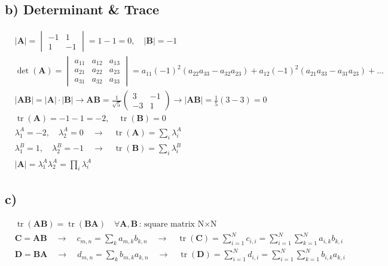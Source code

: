 \documentclass[fleqn]{article}
\DeclareMathOperator{\tr}{tr}
\begin{document}
\subsection*{b) Determinant \& Trace}
\begin{align*}
	&\left|\mathbf{A}\right| =
	\begin{vmatrix}
	-1 & 1 \\
	1 & -1
	\end{vmatrix} = 1-1 = 0,\quad
	\left|\mathbf{B}\right| = -1& \\
	&\det\left(\mathbf{A}\right)=
	\begin{vmatrix}
	a_{11} & a_{12} & a_{13} \\
	a_{21} & a_{22} & a_{23} \\
	a_{31} & a_{32} & a_{33}
	\end{vmatrix}= a_{11}\left(-1\right)^{2}\left(a_{22}a_{33}-a_{32}a_{23}\right)+a_{12}\left(-1\right)^{2}\left(a_{21}a_{33}-a_{31}a_{23}\right)+\ldots& \\
	&\left|\mathbf{AB}\right|=\left|\mathbf{A}\right|\cdot\left|\mathbf{B}\right|\rightarrow\mathbf{AB}=\frac{1}{\sqrt{5}}
	\begin{pmatrix}
	3 & -1 \\
	-3 & 1
	\end{pmatrix}
	\rightarrow\left|\mathbf{AB}\right|=\frac{1}{5}\left(3-3\right)=0& \\
	&\tr\left(\mathbf{A}\right)=-1-1=-2,\quad\tr\left(\mathbf{B}\right)=0& \\
	&\lambda_{1}^{A}=-2,\quad\lambda_{2}^{A}=0\quad\rightarrow\quad\tr\left(\mathbf{A}\right)=\sum_{i}\lambda_{i}^{A}& \\
	&\lambda_{1}^{B}=1,\quad\lambda_{2}^{B}=-1\quad\rightarrow\quad\tr\left(\mathbf{B}\right)=\sum_{i}\lambda_{i}^{B}& \\
	&\left|\mathbf{A}\right|=\lambda_{1}^{A}\lambda_{2}^{A}=\prod_{i}\lambda_{i}^{A}&
\end{align*}

\subsection*{c)}
\begin{align*}
	&\tr\left(\mathbf{AB}\right)=\tr\left(\mathbf{BA}\right)\quad\forall\mathbf{A, B} \text{: square matrix N$\times$N}& \\
	&\mathbf{C=AB}\quad\rightarrow\quad c_{m,n}=\sum_{k}a_{m,k}b_{k,n}\quad\rightarrow\quad\tr\left(\mathbf{C}\right)=\sum_{i=1}^{N}c_{i,i}=\sum_{i=1}^{N}\sum_{k=1}^{N}a_{i,k}b_{k,i}& \\
	&\mathbf{D=BA}\quad\rightarrow\quad d_{m,n}=\sum_{k}b_{m,k}a_{k,n}\quad\rightarrow\quad\tr\left(\mathbf{D}\right)=\sum_{i=1}^{N}d_{i,i}=\sum_{i=1}^{N}\sum_{k=1}^{N}b_{i,k}a_{k,i}&
\end{align*}
\end{document}
